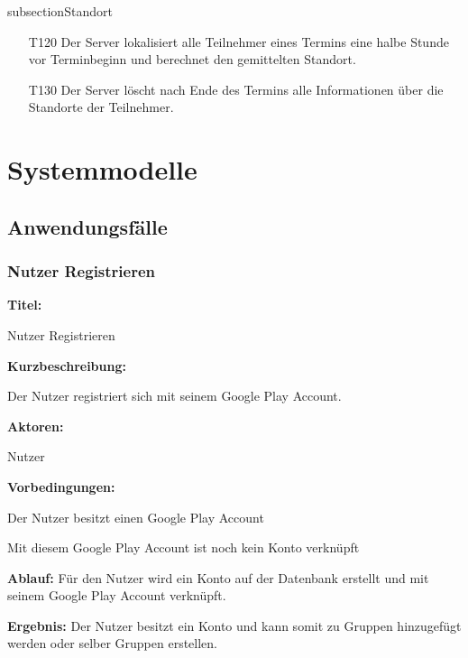 \documentclass{scrartcl}
\begin{document}
	subsection{Standort}
	\begin{itemize}[nosep] 
		\item[T120] Der Server lokalisiert alle Teilnehmer eines Termins eine halbe Stunde vor Terminbeginn und berechnet den gemittelten Standort. 
		\item[T130] Der Server löscht nach Ende des Termins alle Informationen über die Standorte der Teilnehmer. 
	 \end{itemize}	
	
	\newpage
	
	
	\section{Systemmodelle}
	
	\subsection{Anwendungsfälle}
	\subsubsection{Nutzer Registrieren}
	\begin{description}
		\item \textbf{Titel:}
		\begin{description}
			\item Nutzer Registrieren
		\end{description}
		\item \textbf{Kurzbeschreibung:}
		\begin{description}
			\item Der Nutzer registriert sich mit seinem Google Play Account.
		\end{description}
		\item \textbf{Aktoren:}
		\begin{description}
			\item Nutzer 
		\end{description}
		\item \textbf{Vorbedingungen:}
		\begin{description}
			\item Der Nutzer besitzt einen Google Play Account
			\item Mit diesem Google Play Account ist noch kein Konto verknüpft
		\end{description}
		\item \textbf{Ablauf:} \newline Für den Nutzer wird ein Konto auf der Datenbank erstellt und mit seinem Google Play Account verknüpft.
		\item \textbf{Ergebnis:} \newline Der Nutzer besitzt ein Konto und kann somit zu Gruppen hinzugefügt werden oder selber Gruppen erstellen.
	\end{description}
	
\end{document}
